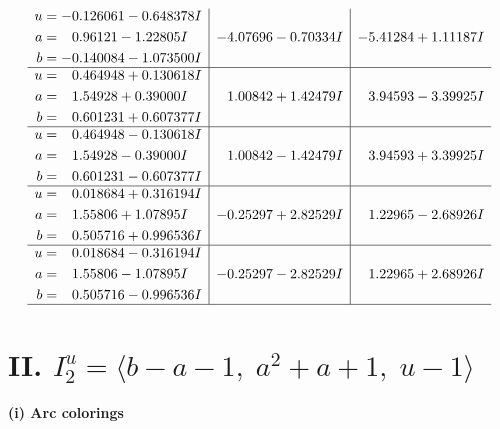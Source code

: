 \documentclass[1p]{elsarticle_modified}
\theoremstyle{definition}
\begin{document}
$$\begin{array}{c|c|c}
\begin{aligned}
u &= -0.126061 - 0.648378 I \\
a &= \phantom{-}0.96121 - 1.22805 I \\
b &= -0.140084 - 1.073500 I\end{aligned}
 & -4.07696 - 0.70334 I & -5.41284 + 1.11187 I \\ \hline\begin{aligned}
u &= \phantom{-}0.464948 + 0.130618 I \\
a &= \phantom{-}1.54928 + 0.39000 I \\
b &= \phantom{-}0.601231 + 0.607377 I\end{aligned}
 & \phantom{-}1.00842 + 1.42479 I & \phantom{-}3.94593 - 3.39925 I \\ \hline\begin{aligned}
u &= \phantom{-}0.464948 - 0.130618 I \\
a &= \phantom{-}1.54928 - 0.39000 I \\
b &= \phantom{-}0.601231 - 0.607377 I\end{aligned}
 & \phantom{-}1.00842 - 1.42479 I & \phantom{-}3.94593 + 3.39925 I \\ \hline\begin{aligned}
u &= \phantom{-}0.018684 + 0.316194 I \\
a &= \phantom{-}1.55806 + 1.07895 I \\
b &= \phantom{-}0.505716 + 0.996536 I\end{aligned}
 & -0.25297 + 2.82529 I & \phantom{-}1.22965 - 2.68926 I \\ \hline\begin{aligned}
u &= \phantom{-}0.018684 - 0.316194 I \\
a &= \phantom{-}1.55806 - 1.07895 I \\
b &= \phantom{-}0.505716 - 0.996536 I\end{aligned}
 & -0.25297 - 2.82529 I & \phantom{-}1.22965 + 2.68926 I\\
 \hline 
 \end{array}$$\newpage\newpage\renewcommand{\arraystretch}{1}
\centering \section*{II. $I^u_{2}= \langle b- a-1,\;a^2+a+1,\;u-1 \rangle$}
\flushleft \textbf{(i) Arc colorings}\\
\end{document}
